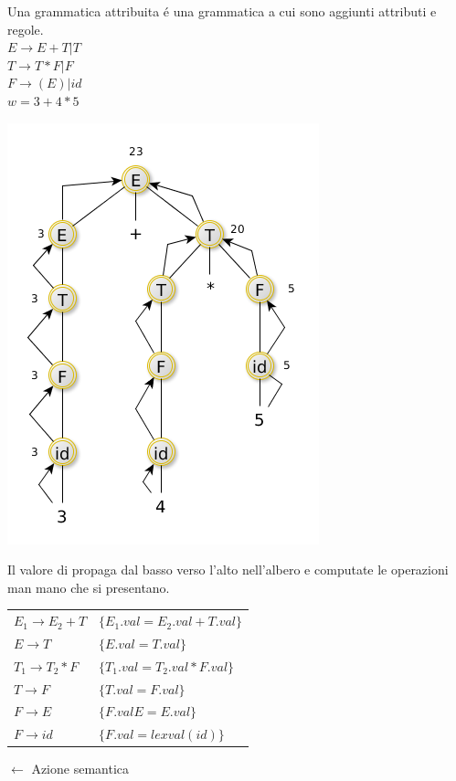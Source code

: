 Una grammatica attribuita \'e una grammatica a cui sono aggiunti attributi e regole.\\[5pt]
$E \rightarrow E + T | T$\\
$T \rightarrow T * F | F$\\
$F \rightarrow (E) | id$\\
$w = 3+4*5$\

\begin{center}
    \includegraphics[scale=0.6]{Chapters/Img/c05_08.png}\\
\end{center}

Il valore di propaga dal basso verso l'alto nell'albero e computate le operazioni man mano che si presentano.\\[5pt]

\begin{tabular}{ll}
	$E_1 \rightarrow E_2 + T $ 		& 	$\{ E_1.val = E_2.val + T.val \}$	\\
	$E \rightarrow T $ 				& 	$\{ E.val = T.val \}$	\\
	$T_1 \rightarrow T_2 * F $ 		& 	$\{ T_1.val = T_2.val * F.val \}$	\\
	$T \rightarrow F $		 		& 	$\{ T.val = F.val \}$	\\
	$F \rightarrow E $		 		& 	$\{ F.valE = E.val \}$	\\
	$F \rightarrow id $ 			& 	$\{ F.val = lexval(id) \}$	\\
\end{tabular}
$\leftarrow$ Azione semantica \\[5pt]


